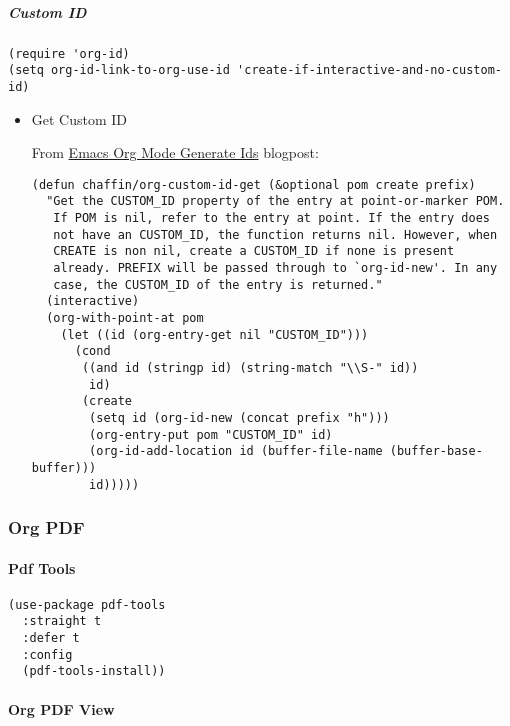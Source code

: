 \documentclass[11pt]{article}
\begin{document}
\subparagraph*{Custom ID}
\label{sec:orgc4a8dd4}

\begin{verbatim}
(require 'org-id)
(setq org-id-link-to-org-use-id 'create-if-interactive-and-no-custom-id)
\end{verbatim}


\begin{itemize}
\item Get Custom ID
\label{sec:org432a77c}

From \href{https://writequit.org/articles/emacs-org-mode-generate-ids.html}{Emacs Org Mode Generate Ids} blogpost:

\begin{verbatim}
(defun chaffin/org-custom-id-get (&optional pom create prefix)
  "Get the CUSTOM_ID property of the entry at point-or-marker POM.
   If POM is nil, refer to the entry at point. If the entry does
   not have an CUSTOM_ID, the function returns nil. However, when
   CREATE is non nil, create a CUSTOM_ID if none is present
   already. PREFIX will be passed through to `org-id-new'. In any
   case, the CUSTOM_ID of the entry is returned."
  (interactive)
  (org-with-point-at pom
    (let ((id (org-entry-get nil "CUSTOM_ID")))
      (cond
       ((and id (stringp id) (string-match "\\S-" id))
        id)
       (create
        (setq id (org-id-new (concat prefix "h")))
        (org-entry-put pom "CUSTOM_ID" id)
        (org-id-add-location id (buffer-file-name (buffer-base-buffer)))
        id)))))
\end{verbatim}
\end{itemize}

\subsubsection*{Org PDF}
\label{sec:org5a1d4da}

\paragraph*{Pdf Tools}
\label{sec:org2150c5b}

\begin{verbatim}
(use-package pdf-tools
  :straight t
  :defer t
  :config
  (pdf-tools-install))
\end{verbatim}

\paragraph*{Org PDF View}
\label{sec:org59f9cde}
\end{document}
